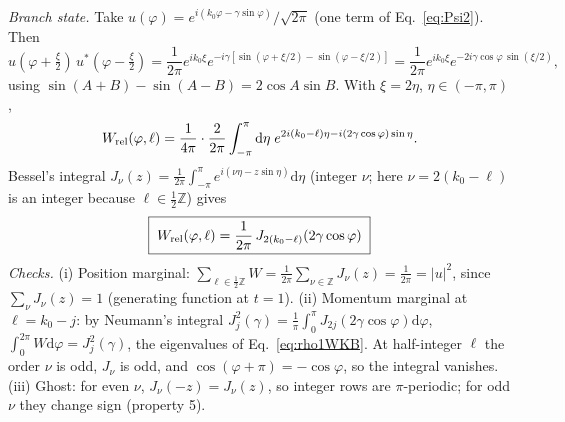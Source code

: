 \documentclass[aps,pra,onecolumn,notitlepage,nofootinbib,11pt]{revtex4-2}
\newcommand{\dd}{\mathrm{d}}
\begin{document}
\emph{Branch state.} Take $u(\varphi)=e^{i(k_{0}\varphi-\gamma\sin\varphi)}/\sqrt{2\pi}$
(one term of Eq.~\eqref{eq:Psi2}). Then
\begin{equation}
u(\varphi+\tfrac{\xi}{2})\,u^{*}(\varphi-\tfrac{\xi}{2})=\frac{1}{2\pi}e^{ik_{0}\xi}
e^{-i\gamma[\sin(\varphi+\xi/2)-\sin(\varphi-\xi/2)]}
=\frac{1}{2\pi}e^{ik_{0}\xi}e^{-2i\gamma\cos\varphi\,\sin(\xi/2)},
\end{equation}
using $\sin(A+B)-\sin(A-B)=2\cos A\sin B$. With $\xi=2\eta$, $\eta\in(-\pi,\pi)$,
\begin{equation}
W_{\rm rel}(\varphi,\ell)=\frac{1}{4\pi}\cdot\frac{2}{2\pi}\int_{-\pi}^{\pi}\dd\eta\;
e^{2i(k_{0}-\ell)\eta-i(2\gamma\cos\varphi)\sin\eta}.
\end{equation}
Bessel's integral $J_{\nu}(z)=\frac{1}{2\pi}\int_{-\pi}^{\pi}e^{i(\nu\eta-z\sin\eta)}\dd\eta$
(integer $\nu$; here $\nu=2(k_{0}-\ell)$ is an integer because $\ell\in\frac12\mathbb{Z}$)
gives
\begin{equation}
\boxed{\;W_{\rm rel}(\varphi,\ell)=\frac{1}{2\pi}\,J_{2(k_{0}-\ell)}\!\left(2\gamma\cos\varphi\right)\;}
\label{eq:Wbranch}
\end{equation}
\emph{Checks.}
(i) Position marginal: $\sum_{\ell\in\frac12\mathbb{Z}}W=\frac{1}{2\pi}\sum_{\nu\in\mathbb{Z}}J_{\nu}(z)
=\frac{1}{2\pi}=|u|^{2}$, since $\sum_{\nu}J_{\nu}(z)=1$ (generating function at $t=1$).
(ii) Momentum marginal at $\ell=k_{0}-j$: by Neumann's integral
$J_{j}^{2}(\gamma)=\frac1\pi\int_{0}^{\pi}J_{2j}(2\gamma\cos\varphi)\dd\varphi$,
$\int_{0}^{2\pi}W\dd\varphi=J_{j}^{2}(\gamma)$, the eigenvalues of Eq.~\eqref{eq:rho1WKB}.
At half-integer $\ell$ the order $\nu$ is odd, $J_{\nu}$ is odd, and $\cos(\varphi+\pi)=-\cos\varphi$,
so the integral vanishes.
(iii) Ghost: for even $\nu$, $J_{\nu}(-z)=J_{\nu}(z)$, so integer rows are $\pi$-periodic; for
odd $\nu$ they change sign (property 5).
\end{document}
